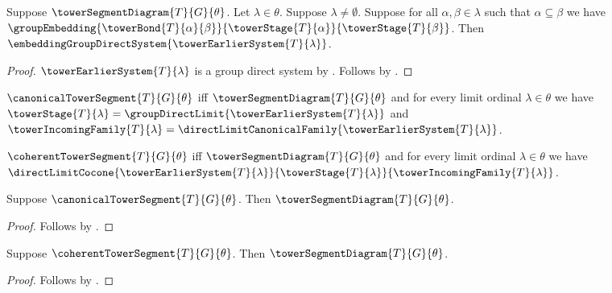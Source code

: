 \begin{proposition}\label{tower_earlier_system_embedding_bridge}
    Suppose $\towerSegmentDiagram{T}{G}{\theta}$.
    Let $\lambda\in\theta$.
    Suppose $\lambda\neq\emptyset$.
    Suppose for all $\alpha,\beta\in\lambda$ such that
        $\alpha\subseteq\beta$ we have
        $\groupEmbedding
            {\towerBond{T}{\alpha}{\beta}}
            {\towerStage{T}{\alpha}}
            {\towerStage{T}{\beta}}$.
    Then $\embeddingGroupDirectSystem{
        \towerEarlierSystem{T}{\lambda}}$.
\end{proposition}
\begin{proof}
    $\towerEarlierSystem{T}{\lambda}$ is a group direct system by
        .
    Follows by
        .
\end{proof}

\begin{definition}\label{canonical_tower_segment}
    $\canonicalTowerSegment{T}{G}{\theta}$ iff
        $\towerSegmentDiagram{T}{G}{\theta}$ and
        for every limit ordinal $\lambda\in\theta$ we have
            $\towerStage{T}{\lambda}=
                \groupDirectLimit{\towerEarlierSystem{T}{\lambda}}$ and
            $\towerIncomingFamily{T}{\lambda}=
                \directLimitCanonicalFamily{
                    \towerEarlierSystem{T}{\lambda}}$.
\end{definition}

\begin{definition}\label{coherent_tower_segment}
    $\coherentTowerSegment{T}{G}{\theta}$ iff
        $\towerSegmentDiagram{T}{G}{\theta}$ and
        for every limit ordinal $\lambda\in\theta$ we have
            $\directLimitCocone
                {\towerEarlierSystem{T}{\lambda}}
                {\towerStage{T}{\lambda}}
                {\towerIncomingFamily{T}{\lambda}}$.
\end{definition}

\begin{proposition}\label{canonical_tower_segment_diagram}
    Suppose $\canonicalTowerSegment{T}{G}{\theta}$.
    Then $\towerSegmentDiagram{T}{G}{\theta}$.
\end{proposition}
\begin{proof}
    Follows by .
\end{proof}

\begin{proposition}\label{coherent_tower_segment_diagram}
    Suppose $\coherentTowerSegment{T}{G}{\theta}$.
    Then $\towerSegmentDiagram{T}{G}{\theta}$.
\end{proposition}
\begin{proof}
    Follows by .
\end{proof}


